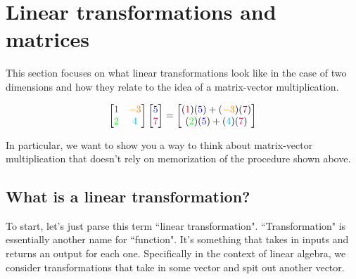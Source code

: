 \section{Linear transformations and matrices}

This section focuses on what linear transformations look like in the case of two
dimensions and how they relate to the idea of a matrix-vector multiplication.

\begin{equation*}
  \begin{bmatrix}
    \textcolor{red}{1} & \textcolor{orange}{-3} \\
    \textcolor{green}{2} & \textcolor{cyan}{4}
  \end{bmatrix}
  \begin{bmatrix}
    \textcolor{blue}{5} \\
    \textcolor{purple}{7}
  \end{bmatrix} = \begin{bmatrix}
    (\textcolor{red}{1})(\textcolor{blue}{5}) +
      (\textcolor{orange}{-3})(\textcolor{purple}{7}) \\
    (\textcolor{green}{2})(\textcolor{blue}{5}) +
      (\textcolor{cyan}{4})(\textcolor{purple}{7})
  \end{bmatrix}
\end{equation*}

In particular, we want to show you a way to think about matrix-vector
multiplication that doesn't rely on memorization of the procedure shown above.

\subsection{What is a linear transformation?}

To start, let's just parse this term ``linear transformation". ``Transformation"
is essentially another name for ``function". It's something that takes in inputs
and returns an output for each one. Specifically in the context of linear
algebra, we consider transformations that take in some vector and spit out
another vector.

\begin{bookfigure}
\end{bookfigure}

